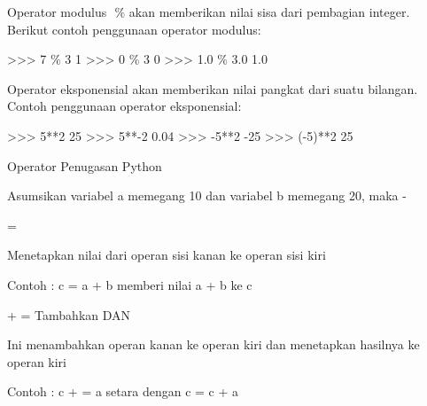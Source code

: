 \vspace{12pt}
\noindent 
Operator modulus $  $ $  \%  $ $  $akan memberikan nilai sisa dari pembagian integer. Berikut contoh penggunaan operator modulus: \par
\vspace{12pt}
\noindent 
>>> 7  $  \%  $ 3\vspace{\baselineskip}
1\vspace{\baselineskip}
>>> 0  $  \%  $ 3\vspace{\baselineskip}
0\vspace{\baselineskip}
>>> 1.0  $  \%  $ 3.0\vspace{\baselineskip}
1.0 \par
\vspace{12pt}
\noindent 
Operator eksponensial $  $akan memberikan nilai pangkat dari suatu bilangan. Contoh penggunaan operator eksponensial: \par
\vspace{12pt}
\noindent 
>>> 5**2\vspace{\baselineskip}
25\vspace{\baselineskip}
>>> 5**-2\vspace{\baselineskip}
0.04\vspace{\baselineskip}
>>> -5**2\vspace{\baselineskip}
-25\vspace{\baselineskip}
>>> (-5)**2\vspace{\baselineskip}
25 \par
\vspace{12pt}
\noindent 
Operator Penugasan Python \par
\vspace{12pt}
\noindent 
Asumsikan variabel a memegang 10 dan variabel b memegang 20, maka - \par
\vspace{12pt}
\noindent 
= \par
\noindent 
Menetapkan nilai dari operan sisi kanan ke operan sisi kiri \hspace*{4.41in}  \par
\noindent 
Contoh : c = a + b memberi nilai a + b ke c \par
\noindent 
\vspace{12pt}
\noindent 
+ = Tambahkan DAN \par
\noindent 
Ini menambahkan operan kanan ke operan kiri dan menetapkan hasilnya ke operan kiri \par
\noindent 
Contoh : c + = a setara dengan c = c + a \par
